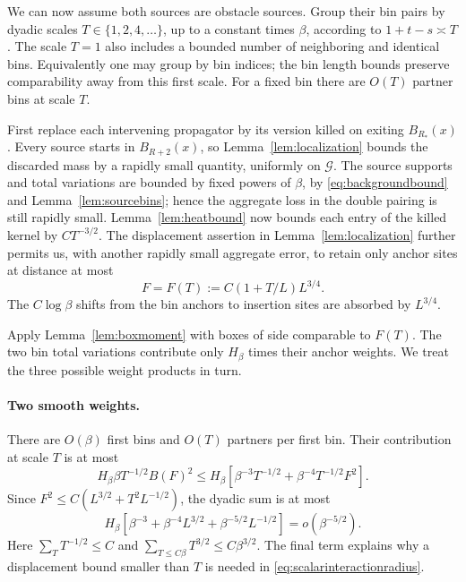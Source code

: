 We can now assume both sources are obstacle sources.  Group their
bin pairs by dyadic scales $T\in\{1,2,4,\ldots\}$, up to a constant
times $\beta$, according to $1+t-s\asymp T$.  The scale $T=1$
also includes a bounded number of neighboring and identical bins.
Equivalently one may group by bin indices; the bin length bounds
preserve comparability away from this first scale.  For a fixed bin
there are $O(T)$ partner bins at scale $T$.

First replace each intervening propagator by its version killed on
exiting $B_{R_*}(x)$.  Every source starts in $B_{R+2}(x)$, so
Lemma~\ref{lem:localization} bounds the discarded mass by a rapidly
small quantity, uniformly on $\mathcal G$.  The source supports and
total variations are bounded by fixed powers of $\beta$, by
\eqref{eq:backgroundbound} and Lemma~\ref{lem:sourcebins}; hence the
aggregate loss in the double pairing is still rapidly small.
Lemma~\ref{lem:heatbound} now bounds each entry of the killed
kernel by $CT^{-3/2}$.  The displacement assertion in
Lemma~\ref{lem:localization} further permits us, with another rapidly
small aggregate error, to retain only anchor sites at distance at most
\begin{equation}\label{eq:scalarinteractionradius}
 F=F(T):=C(1+T/L)L^{3/4}.
\end{equation}
The $C\log\beta$ shifts from the bin anchors to insertion sites
are absorbed by $L^{3/4}$.

Apply Lemma~\ref{lem:boxmoment} with boxes of side comparable to
$F(T)$.  The two bin total variations contribute only $H_\beta$
times their anchor weights.  We treat the three possible weight
products in turn.

\paragraph{Two smooth weights.}
There are $O(\beta)$ first bins and $O(T)$ partners per first bin.
Their contribution at scale $T$ is at most
\begin{equation}\label{eq:WWscale}
 H_\beta\beta T^{-1/2}B(F)^2
 \le H_\beta\left[\beta^{-3}T^{-1/2}
                        +\beta^{-4}T^{-1/2}F^2\right].
\end{equation}
Since $F^2\le C(L^{3/2}+T^2L^{-1/2})$, the dyadic sum is at most
\begin{equation}\label{eq:WWsum}
 H_\beta\left[
       \beta^{-3}+\beta^{-4}L^{3/2}
                       +\beta^{-5/2}L^{-1/2}\right]
                         =o(\beta^{-5/2}).
\end{equation}
Here $\sum_TT^{-1/2}\le C$ and
$\sum_{T\le C\beta}T^{3/2}\le C\beta^{3/2}$.
The final term explains why a displacement bound smaller than
$T$ is needed in \eqref{eq:scalarinteractionradius}.

